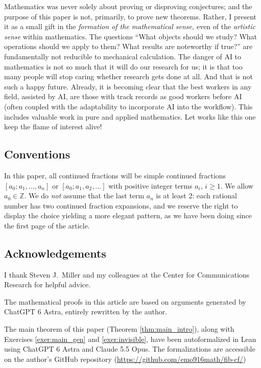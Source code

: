 \documentclass{article}
\numberwithin{equation}{section}
\theoremstyle{definition}
\theoremstyle{remark}
\newcommand{\ZZ}{\mathbb{Z}}
\newcommand{\<}{\left\langle}
\renewcommand{\>}{\right\rangle}
\begin{document}
Mathematics was never solely about proving or disproving conjectures; and the purpose of this paper is not, primarily, to prove new theorems. Rather, I present it as a small gift in the \emph{formation of the mathematical sense,} even of the \emph{artistic sense} within mathematics. The questions ``What objects should we study? What operations should we apply to them? What results are noteworthy if true?'' are fundamentally not reducible to mechanical calculation. The danger of AI to mathematics is not so much that it will do our research for us; it is that too many people will stop caring whether research gets done at all. And that is not such a happy future. Already, it is becoming clear that the best workers in any field, assisted by AI, are those with track records as good workers before AI (often coupled with the adaptability to incorporate AI into the workflow). This includes valuable work in pure and applied mathematics. Let works like this one keep the flame of interest alive!

\subsection{Conventions}
In this paper, all continued fractions will be simple continued fractions $[a_0; a_1, \ldots, a_n]$ or $[a_0; a_1, a_2, \ldots]$ with positive integer terms $a_i$, $i \geq 1$. We allow $a_0 \in \ZZ$. We do \emph{not} assume that the last term $a_n$ is at least $2$: each rational number has two continued fraction expansions, and we reserve the right to display the choice yielding a more elegant pattern, as we have been doing since the first page of the article.

\subsection{Acknowledgements}
I thank Steven J.\ Miller and my colleagues at the Center for Communications Research for helpful advice.

The mathematical proofs in this article are based on arguments generated by ChatGPT 6 Astra, entirely rewritten by the author.

The main theorem of this paper (Theorem \ref{thm:main_intro}), along with Exercises \ref{exer:main_gen} and \ref{exer:invisible}, have been autoformalized in Lean using ChatGPT 6 Astra and Claude 5.5 Opus. The formalizations are accessible on the author's GitHub repository (\url{https://github.com/emo916math/fib-cf/})
\end{document}
